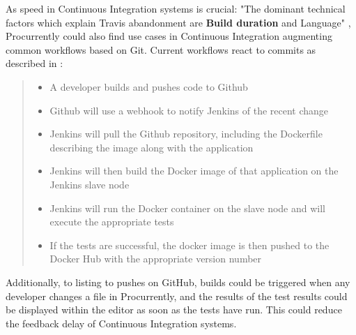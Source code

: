 As speed in Continuous Integration systems is crucial: "The dominant technical factors which explain Travis abandonment are \textbf{Build duration} and Language" \cite{8595199}, Procurrently could also find use cases in Continuous Integration augmenting common workflows based on Git. 
Current workflows react to commits as described in \cite{8695332}:

\blockquote{
    \begin{itemize}
        \item A developer builds and pushes code to Github
        \item Github will use a webhook to notify Jenkins of the recent change
        \item Jenkins will pull the Github repository, including the Dockerfile describing the image along with the application
        \item Jenkins will then build the Docker image of that application on the Jenkins slave node
        \item Jenkins will run the Docker container on the slave node and will execute the appropriate tests
        \item If the tests are successful, the docker image is then pushed to the Docker Hub with the appropriate version number
    \end{itemize}
}

Additionally, to listing to pushes on GitHub, builds could be triggered when any developer changes a file in Procurrently, and the results of the test results could be displayed within the editor as soon as the tests have run. This could reduce the feedback delay of Continuous Integration systems.